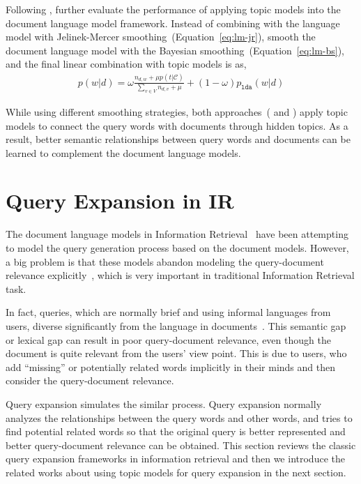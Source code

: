 
Following \cite{wei-06}, \cite{Lu-2011} further evaluate the
performance of applying topic models into the document language model
framework. Instead of combining with the language model with
Jelinek-Mercer smoothing~(Equation~\ref{eq:lm-jr}), \cite{Lu-2011}
smooth the document language model with the Bayesian
smoothing~(Equation~\ref{eq:lm-bs}), and the final linear combination
with topic models is as,
\begin{align}
p(w|d) = \omega \frac{n_{d,w} + \mu p(t|\mathcal{C})}{\sum_{v \in V} n_{d,v} + \mu}  + (1 - \omega) p_{\texttt{lda}}(w|d)
\end{align}

While using different smoothing strategies, both
approaches~(\citep{wei-06} and \citep{Lu-2011}) apply topic models to
connect the query words with documents through hidden topics. As a
result, better semantic relationships between query words and
documents can be learned to complement the document language models.

\section{Query Expansion in IR}

The document language models in Information
Retrieval~\citep{PonteCroft} have been attempting to model the query
generation process based on the document models. However, a big
problem is that these models abandon modeling the query-document
relevance explicitly~\citep{Lavrenko-2001}, which is very important in
traditional Information Retrieval task.

In fact, queries, which are normally brief and using informal
languages from users, diverse significantly from the language in
documents~\citep{Muller-2009}. This semantic gap or lexical gap can
result in poor query-document relevance, even though the document is
quite relevant from the users' view point. This is due to users, who
add ``missing'' or potentially related words implicitly in their minds
and then consider the query-document relevance.

Query expansion simulates the similar process. Query expansion
normally analyzes the relationships between the query words and other
words, and tries to find potential related words so that the original
query is better represented and better query-document relevance can be
obtained. This section reviews the classic query expansion frameworks
in information retrieval and then we introduce the related works about
using topic models for query expansion in the next section.

